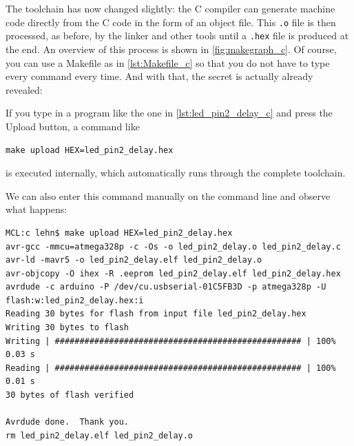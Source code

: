 \documentclass[a4paper,12pt]{article}
\begin{document}
\noindent
The toolchain has now changed slightly: the C compiler can generate machine
code directly from the C code in the form of an object file. This
\texttt{.o} file is then processed, as before, by the linker and other tools
until a \texttt{.hex} file is produced at the end. An overview of this process
is shown in \autoref{fig:makegraph_c}. Of course, you can use a Makefile as
in \autoref{lst:Makefile_c} so that you do not have to type every command
every time. And with that, the secret is actually already revealed:

\begin{tcolorbox}[
	colback=myblue!5!white, colframe=myblue,
	title=What happens when you click ``Upload''?
]
If you type in a program like the one in \autoref{lst:led_pin2_delay_c} and
press the Upload button, a command like

\texttt{make upload HEX=led\_pin2\_delay.hex}

is executed internally, which automatically runs through the complete
toolchain.
\end{tcolorbox}

\noindent
We can also enter this command manually on the command line and observe what
happens:

\begin{lstlisting}
MCL:c lehn$ make upload HEX=led_pin2_delay.hex
avr-gcc -mmcu=atmega328p -c -Os -o led_pin2_delay.o led_pin2_delay.c
avr-ld -mavr5 -o led_pin2_delay.elf led_pin2_delay.o
avr-objcopy -O ihex -R .eeprom led_pin2_delay.elf led_pin2_delay.hex
avrdude -c arduino -P /dev/cu.usbserial-01C5FB3D -p atmega328p -U flash:w:led_pin2_delay.hex:i
Reading 30 bytes for flash from input file led_pin2_delay.hex
Writing 30 bytes to flash
Writing | ################################################## | 100% 0.03 s
Reading | ################################################## | 100% 0.01 s
30 bytes of flash verified

Avrdude done.  Thank you.
rm led_pin2_delay.elf led_pin2_delay.o
\end{lstlisting}
\end{document}
